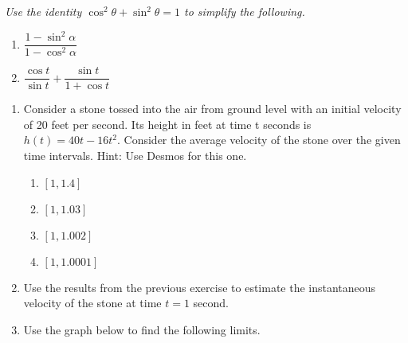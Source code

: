\documentclass[11pt]{article}
\begin{document}
\noindent
\textit{Use the identity $\cos^2 \theta + \sin^2 \theta = 1$ to simplify the following.}
\begin{multicols}{2}
\begin{enumerate}
\setcounter{enumi}{\theenumCount}
\item $\dfrac{1-\sin^2 \alpha}{1- \cos^2 \alpha}$
\item $\dfrac{\cos t}{\sin t} + \dfrac{\sin t}{1+\cos t}$
\setcounter{enumCount}{\theenumi}
\end{enumerate}
\end{multicols}
\vfill

\begin{enumerate}
\setcounter{enumi}{\theenumCount}
\item Consider a stone tossed into the air from ground level with an initial velocity of 20 feet per second. Its height in feet at time t seconds is $h(t)=40t-16t^2$. Consider the average velocity of the stone over the given time intervals. Hint: Use Desmos for this one.
\begin{multicols}{4}
\begin{enumerate}
\item $[1,1.4]$
\item $[1,1.03]$
\item $[1,1.002]$
\item $[1,1.0001]$
\end{enumerate}
\end{multicols}
\vfill

\newpage
\item Use the results from the previous exercise to estimate the instantaneous velocity of the stone at time $t = 1$ second.
\vfill


\noindent 
\item Use the graph below to find the following limits. 
\begin{center}
\end{center}


\end{enumerate}
\end{document}
